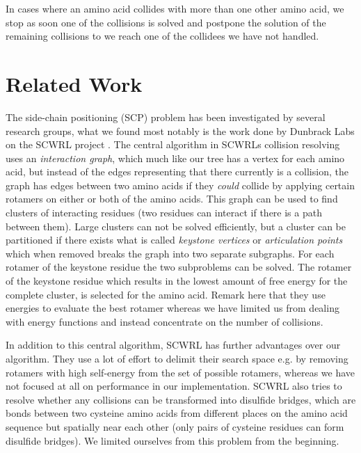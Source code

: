 In cases where an amino acid collides with more than one
other amino acid, we stop as soon one of the collisions is solved and
postpone the solution of the remaining collisions to we reach one of
the collidees we have not handled.


\section{Related Work}
The side-chain positioning (SCP) problem has been investigated by
several research groups, what we found most notably is the work done
by Dunbrack Labs on the SCWRL project \cite{canutescu2003graph,
  krivov2009improved}. The central algorithm in SCWRLs collision
resolving uses an \textit{interaction graph}, which much like our tree
has a vertex for each amino acid, but instead of the edges
representing that there currently is a collision, the graph has edges
between two amino acids if they \textit{could} collide by applying
certain rotamers on either or both of the amino acids. This graph can
be used to find clusters of interacting residues (two residues can
interact if there is a path between them). Large clusters can not be
solved efficiently, but a cluster can be partitioned if there exists
what is called \textit{keystone vertices} or \textit{articulation
  points} which when removed breaks the graph into two separate
subgraphs. For each rotamer of the keystone residue the two
subproblems can be solved. The rotamer of the keystone residue which
results in the lowest amount of free energy for the complete cluster,
is selected for the amino acid. Remark here that they use energies to
evaluate the best rotamer whereas we have limited us from dealing
with energy functions and instead concentrate on the number of
collisions.

In addition to this central algorithm, SCWRL has further advantages
over our algorithm. They use a lot of effort to delimit their search
space e.g. by removing rotamers with high self-energy from the set of
possible rotamers, whereas we have not focused at all on performance
in our implementation. SCWRL also tries to resolve whether any
collisions can be transformed into disulfide bridges, which are bonds
between two cysteine amino acids from different places on the amino
acid sequence but spatially near each other (only pairs of cysteine
residues can form disulfide bridges). We limited ourselves from this
problem from the beginning.

